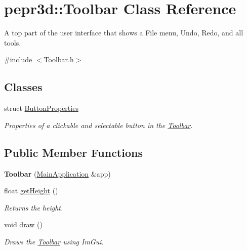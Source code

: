 \hypertarget{classpepr3d_1_1_toolbar}{}\section{pepr3d\+::Toolbar Class Reference}
\label{classpepr3d_1_1_toolbar}


A top part of the user interface that shows a File menu, Undo, Redo, and all tools.  




{\ttfamily \#include $<$Toolbar.\+h$>$}

\subsection*{Classes}
\begin{DoxyCompactItemize}
\item 
struct \mbox{\hyperlink{structpepr3d_1_1_toolbar_1_1_button_properties}{Button\+Properties}}
\begin{DoxyCompactList}\small\item\em Properties of a clickable and selectable button in the \mbox{\hyperlink{classpepr3d_1_1_toolbar}{Toolbar}}. \end{DoxyCompactList}\end{DoxyCompactItemize}
\subsection*{Public Member Functions}
\begin{DoxyCompactItemize}
\item 
\mbox{\label{classpepr3d_1_1_toolbar_a84600ac501c165a06e775e70e5414a5a}} 
{\bfseries Toolbar} (\mbox{\hyperlink{classpepr3d_1_1_main_application}{Main\+Application}} \&app)
\item 
\mbox{\label{classpepr3d_1_1_toolbar_a05d027cd466b54792502653043a8db60}} 
float \mbox{\hyperlink{classpepr3d_1_1_toolbar_a05d027cd466b54792502653043a8db60}{get\+Height}} ()
\begin{DoxyCompactList}\small\item\em Returns the height. \end{DoxyCompactList}\item 
\mbox{\label{classpepr3d_1_1_toolbar_ab84f478320ce74f523bede52c0966271}} 
void \mbox{\hyperlink{classpepr3d_1_1_toolbar_ab84f478320ce74f523bede52c0966271}{draw}} ()
\begin{DoxyCompactList}\small\item\em Draws the \mbox{\hyperlink{classpepr3d_1_1_toolbar}{Toolbar}} using Im\+Gui. \end{DoxyCompactList}\end{DoxyCompactItemize}
